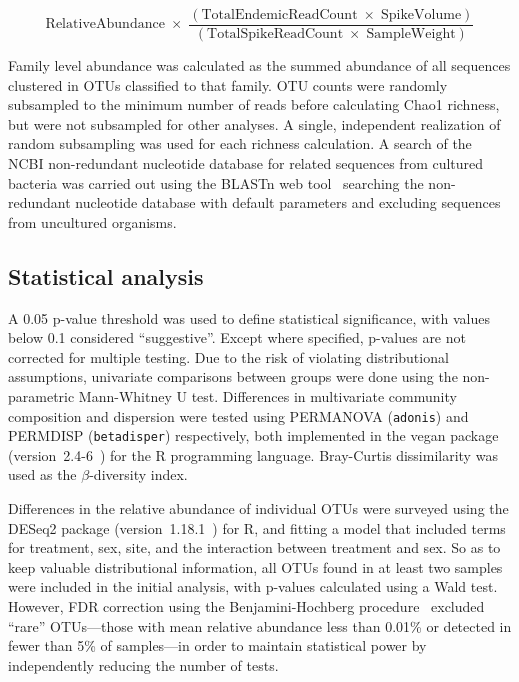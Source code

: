 \documentclass{doc/template/bmcart-nofigbox}
\newcommand{\compcmd}[1]{\texttt{#1}}
\begin{document}
\[
\mathrm{RelativeAbundance} \;\times\;
    \frac{(\mathrm{TotalEndemicReadCount} \;\times\; \mathrm{SpikeVolume})}
         {(\mathrm{TotalSpikeReadCount} \;\times\; \mathrm{SampleWeight})}
\]

Family level abundance was calculated as the summed abundance of all sequences
clustered in OTUs classified to that family.
OTU counts were randomly subsampled to the minimum number of reads before
calculating Chao1 richness, but were not subsampled for other analyses.
A single, independent realization of random subsampling was used for each
richness calculation.
A search of the NCBI non-redundant nucleotide database for
related sequences from cultured bacteria was carried out using the
BLASTn web tool~\cite{Wheeler2000} searching the non-redundant nucleotide database
with default parameters and excluding sequences from uncultured organisms.

\subsection*{Statistical analysis}

A 0.05 p-value threshold was used to define statistical significance, with
values below 0.1 considered ``suggestive''.
Except where specified, p-values are not corrected for multiple testing.
Due to the risk of violating distributional assumptions, univariate comparisons
between groups were done using the non-parametric Mann-Whitney U test.
Differences in multivariate community composition and dispersion were tested
using PERMANOVA (\compcmd{adonis}) and PERMDISP (\compcmd{betadisper}) respectively,
both implemented in the vegan package (version~2.4-6~\cite{Oksanen2018})
for the R programming language.
Bray-Curtis dissimilarity was used as the $\beta$-diversity index.

Differences in the relative abundance of individual OTUs were surveyed
using the DESeq2 package (version~1.18.1~\cite{Love2014a}) for R,
and fitting a model that included terms for treatment, sex, site, and
the interaction between treatment and sex.
So as to keep valuable distributional information,
all OTUs found in at least two samples were included in the initial analysis,
with p-values calculated using a Wald test.
However, FDR correction using the
Benjamini-Hochberg procedure~\cite{Benjamini1995} excluded ``rare'' OTUs---those
with mean relative abundance less than 0.01\% or detected in fewer than 5\% of
samples---in order to maintain statistical power by independently reducing
the number of tests.
\end{document}
